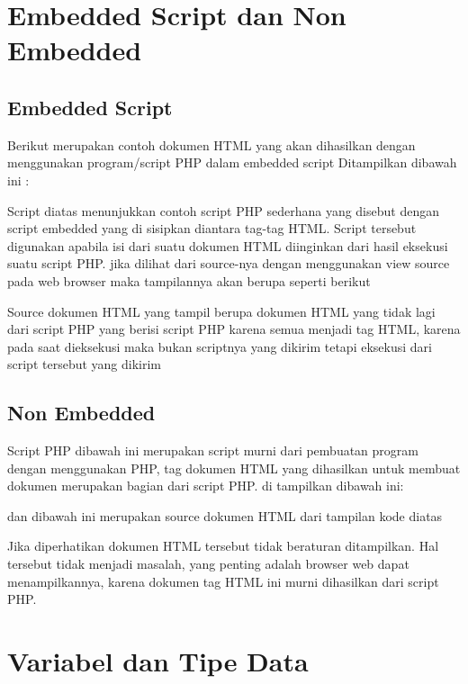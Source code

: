 \section{Embedded Script dan Non Embedded}
\subsection{Embedded Script}
  \item Berikut merupakan contoh dokumen HTML yang akan dihasilkan dengan menggunakan program/script PHP dalam embedded script
    Ditampilkan dibawah ini  :
    
Script diatas menunjukkan contoh script PHP sederhana yang disebut dengan script embedded yang di sisipkan diantara tag-tag HTML. Script tersebut digunakan apabila isi dari suatu dokumen HTML diinginkan dari hasil eksekusi suatu script PHP. jika dilihat dari source-nya dengan menggunakan view source pada web browser maka tampilannya akan berupa seperti berikut
    
Source dokumen HTML yang tampil berupa dokumen HTML yang tidak lagi dari script PHP yang berisi script PHP karena semua menjadi tag HTML, karena pada saat dieksekusi maka bukan scriptnya yang dikirim tetapi eksekusi dari script tersebut yang dikirim 
\subsection{Non Embedded}
   \item Script PHP dibawah ini merupakan script murni dari pembuatan program dengan menggunakan PHP, tag dokumen HTML yang dihasilkan untuk membuat dokumen merupakan bagian dari script PHP. di tampilkan dibawah ini:
  
dan dibawah ini merupakan source dokumen HTML dari tampilan kode diatas  
  
Jika diperhatikan dokumen HTML tersebut tidak beraturan ditampilkan. Hal tersebut tidak menjadi masalah, yang penting adalah browser web dapat menampilkannya, karena dokumen tag HTML ini murni dihasilkan dari script PHP. 

\section{Variabel dan Tipe Data}

